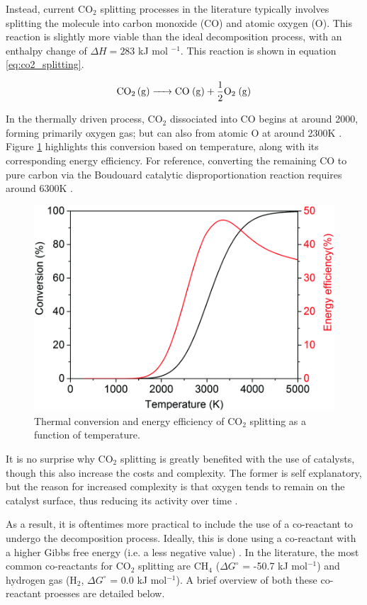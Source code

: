 \newpage

Instead, current CO$_2$ splitting processes in the literature typically involves splitting the molecule into carbon monoxide (CO) and atomic oxygen (O). This reaction is slightly more viable than the ideal decomposition process, with an enthalpy change of $\Delta H = 283 $ kJ mol $^{-1}$. This reaction is shown in equation \ref{eq:co2_splitting}.

\begin{equation}
    \ce{CO_2 (g) -> CO (g) + \frac{1}{2}O_2 (g)}
    \label{eq:co2_splitting}
\end{equation}

In the thermally driven process, CO$_2$ dissociated into CO begins at around 2000, forming primarily oxygen gas; but can also from atomic O at around 2300K \cite{Snoeckx2017, Centi2021}. Figure \ref{fig:thermal_co2_conversion} highlights this conversion based on temperature, along with its corresponding energy efficiency. For reference, converting the remaining CO to pure carbon via the Boudouard catalytic disproportionation reaction requires around 6300K \cite{Centi2021}. 

\begin{figure}[h!]
	\centering
	\includegraphics[width=0.7\linewidth]{chapter_3/figures/thermal_co2_conversion.png}
	\caption{Thermal conversion and energy efficiency of CO$_2$ splitting as a function of temperature. \cite{Snoeckx2017}}
	\label{fig:thermal_co2_conversion}
\end{figure}

It is no surprise why CO$_2$ splitting is greatly benefited with the use of catalysts, though this also increase the costs and complexity. The former is self explanatory, but the reason for increased complexity is that oxygen tends to remain on the catalyst surface, thus reducing its activity over time \cite{Shin2017}. 

As a result, it is oftentimes more practical to include the use of a co-reactant to undergo the decomposition process. Ideally, this is done using a co-reactant with a higher Gibbs free energy (i.e. a less negative value) \cite{jiang_xiao_kuznetsov_edwards_2010}. In the literature, the most common co-reactants for CO$_2$ splitting are CH$_4$ ($\Delta G^\circ$ = -50.7 kJ mol$^{-1}$) and hydrogen gas (H$_2$, $\Delta G^\circ$ = 0.0 kJ mol$^{-1}$). A brief overview of both these co-reactant proesses are detailed below.

